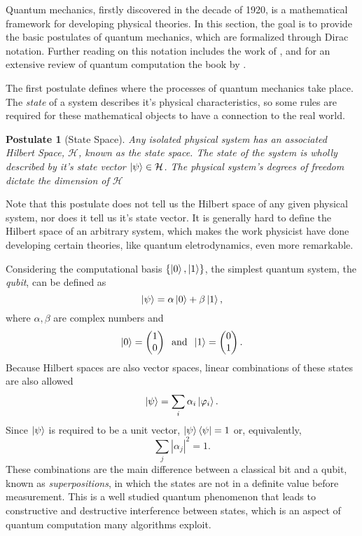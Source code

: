 \documentclass[../../../dissertation.tex]{subfiles}
\newtheorem{post}{Postulate}
\begin{document}
Quantum mechanics, firstly discovered in the decade of 1920, is a mathematical
framework for developing physical theories. In this section, the goal is to
provide the basic postulates of quantum mechanics, which are formalized through
Dirac notation. Further reading on this notation includes the work of
\cite{sakurai1994}, and for an extensive review of quantum computation the
book by \cite{nielsen2011}.\par  
The first postulate defines where the processes of quantum mechanics take
place. The \textit{state} of a system describes it's physical characteristics,
so some rules are required for these mathematical objects to have a connection
to the real world.
\begin{post}[State Space] 
	Any isolated physical system has an associated Hilbert Space,
	$\mathcal{H}$, known as the state space. The state of the system is
	wholly described by it's state vector $\ket{\psi} \in \mathcal{H}$. The
	physical system's degrees of freedom dictate the dimension of
	$\mathcal{H}$\par
\end{post}
Note that this postulate does not tell us the Hilbert space of any given
physical system, nor does it tell us it's state vector. It is generally hard to
define the Hilbert space of an arbitrary system, which makes the work physicist
have done developing certain theories, like quantum eletrodynamics, even more
remarkable.\par 
Considering the computational basis $\{\ket{0},\ket{1}\}$, the simplest quantum
system, the \textit{qubit}, can be defined as 
\begin{equation}
	\ket{\psi} = \alpha \ket{0} + \beta \ket{1},
\end{equation}
where $\alpha,\beta$ are complex numbers and
\begin{equation}
	\ket{0} = \begin{pmatrix} 1 \\0 \end{pmatrix}  \; \; \text{and}  \;  \;  \ket{1} = \begin{pmatrix} 0 \\1 \end{pmatrix}.
\end{equation}
Because Hilbert spaces are also vector spaces, linear combinations of these
states are also allowed 
\begin{equation}
	\ket{\psi} = \sum_i \alpha_i \ket{\varphi_i}.
\end{equation}
Since $\ket{\psi}$ is required to be a unit vector, $\ket{\psi}\bra{\psi}=1$ or, equivalently,
\begin{equation}
	\sum_j | \alpha_j |^2 = 1 .
\end{equation}
These combinations are the main difference between a classical bit and a qubit,
known as \textit{superpositions}, in which the states are not in a definite
value before measurement. This is a well studied quantum phenomenon that leads
to constructive and destructive interference between states, which is an aspect
of quantum computation many algorithms exploit.\par
\end{document}
